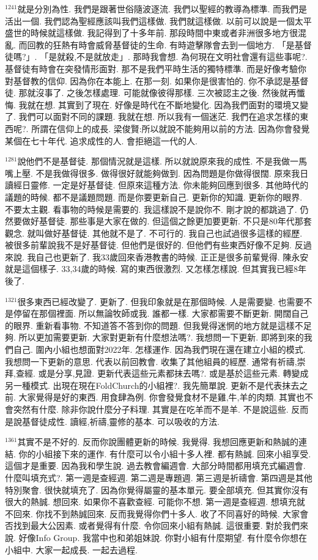 \documentclass{book}
\begin{document}
$^{1241}$就是分別為性.
我們是跟著世俗隨波逐流.
我們以聖經的教導為標準.
而我們是活出一個.
我們認為聖經應該叫我們這樣做.
我們就這樣做.
以前可以說是一個太平盛世的時候就這樣做.
我記得到了十多年前.
那段時間中東或者非洲很多地方很混亂.
而回教的狂熱有時會威脅基督徒的生命.
有時遊擊隊會去到一個地方.
「是基督徒嗎?」.
「是就殺,不是就放走」.
那時我會想.
為何現在文明社會還有這些事呢?.
基督徒有時會在突發情形面對.
那不是我們平時生活的獨特標準.
而是好像考驗你對基督教的信仰.
因為你在本能上.
在那一刻.
如果你是很害怕的.
你不承認是基督徒.
那就沒事了.
之後怎樣處理.
可能就像彼得那樣.
三次被認主之後.
然後就再懺悔.
我就在想.
其實到了現在.
好像是時代在不斷地變化.
因為我們面對的環境又變了.
我們可以面對不同的課題.
我就在想.
所以我有一個迷茫.
我們在追求怎樣的東西呢?.
所謂在信仰上的成長.
梁俊賢:所以就說不能夠用以前的方法.
因為你會發覺某個在七十年代.
追求成性的人.
會拒絕這一代的人.

$^{1281}$說他們不是基督徒.
那個情況就是這樣.
所以就說原來我的成性.
不是我做一馬嘴上壓.
不是我做得很多.
做得很好就能夠做到.
因為問題是你做得很闊.
原來我日讀經日靈修.
一定是好基督徒.
但原來這種方法.
你未能夠回應到很多.
其他時代的議題的時候.
都不是議題問題.
而是你要更新自己.
更新你的知識.
更新你的眼界.
不要太主觀.
看事物的時候是需要的.
我這樣說不是說你不.
剛才說的都跳過了.
仍然要做好基督徒.
那些事是大家在做的.
但這個之餘更加要更新.
不只是80年代那套觀念.
就叫做好基督徒.
其他就不是了.
不可行的.
我自己也試過很多這樣的經歷.
被很多前輩說我不是好基督徒.
但他們是很好的.
但他們有些東西好像不足夠.
反過來說.
我自己也更新了.
我33歲回來香港教書的時候.
正正是很多前輩覺得.
陳永安就是這個樣子.
33,34歲的時候.
寫的東西很激烈.
又怎樣怎樣說.
但其實我已經8年後了.

$^{1321}$很多東西已經改變了.
更新了.
但我印象就是在那個時候.
人是需要變.
也需要不是停留在那個裡面.
所以無論牧師或我.
誰都一樣.
大家都需要不斷更新.
開闊自己的眼界.
重新看事物.
不知道答不答到你的問題.
但我覺得迷惘的地方就是這樣不足夠.
所以更加需要更新.
大家對更新有什麼想法嗎?.
我想問一下更新.
即將到來的我們自己.
圍內小組也想面對2022年.
怎樣運作.
因為我們現在還在建立小組的模式.
我想問一下更新的意思.
代表以前回教會.
收集了其他組員的經歷.
通常有祈禱,崇拜,查經.
或是分享,見證.
更新代表這些元素都抹去嗎?.
或是基於這些元素.
轉變成另一種模式.
出現在現在FoldChurch的小組裡?.
我先簡單說.
更新不是代表抹去之前.
大家覺得是好的東西.
用食肆為例.
你會發覺食材不是雞,牛,羊的肉類.
其實也不會突然有什麼.
除非你說什麼分子料理.
其實是在吃羊而不是羊.
不是說這些.
反而是說基督徒成性.
讀經,祈禱,靈修的基本.
可以吸收的方法.

$^{1361}$其實不是不好的.
反而你說團體更新的時候.
我覺得.
我想回應更新和熱誠的連結.
你的小組接下來的運作.
有什麼可以令小組十多人裡.
都有熱誠.
回來小組享受.
這個才是重要.
因為我和學生說.
過去教會編週會.
大部分時間都用填充式編週會.
什麼叫填充式?.
第一週是查經週.
第二週是專題週.
第三週是祈禱會.
第四週是其他特別聚會.
很快就填充了.
因為你覺得屬靈的基本單元.
要全部填充.
但其實你沒有很大的熱誠.
想回來.
如果你不喜歡查經.
可能你不想.
第一週是查經週.
想填充就不回來.
你找不到熱誠回來.
反而我覺得你們十多人.
收了不同喜好的時候.
大家會否找到最大公因素.
或者覺得有什麼.
令你回來小組有熱誠.
這很重要.
對於我們來說.
好像Info Group.
我當中也和弟姐妹說.
你對小組有什麼期望.
有什麼令你想在小組中.
大家一起成長.
一起去過程.
\end{document}
